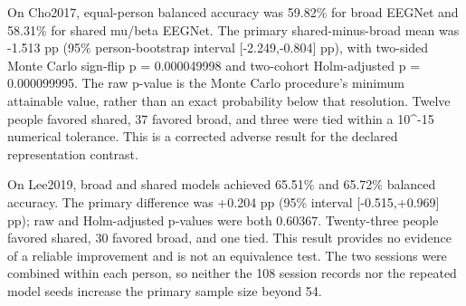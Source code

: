 \documentclass[11pt]{article}
\begin{document}
On Cho2017, equal-person balanced accuracy was 59.82\% for broad EEGNet and 58.31\% for shared mu/beta EEGNet. The primary shared-minus-broad mean was -1.513 pp (95\% person-bootstrap interval [-2.249,-0.804] pp), with two-sided Monte Carlo sign-flip p = 0.000049998 and two-cohort Holm-adjusted p = 0.000099995. The raw p-value is the Monte Carlo procedure's minimum attainable value, rather than an exact probability below that resolution. Twelve people favored shared, 37 favored broad, and three were tied within a 10\textasciicircum{}-15 numerical tolerance. This is a corrected adverse result for the declared representation contrast.

On Lee2019, broad and shared models achieved 65.51\% and 65.72\% balanced accuracy. The primary difference was +0.204 pp (95\% interval [-0.515,+0.969] pp); raw and Holm-adjusted p-values were both 0.60367. Twenty-three people favored shared, 30 favored broad, and one tied. This result provides no evidence of a reliable improvement and is not an equivalence test. The two sessions were combined within each person, so neither the 108 session records nor the repeated model seeds increase the primary sample size beyond 54.
\end{document}
